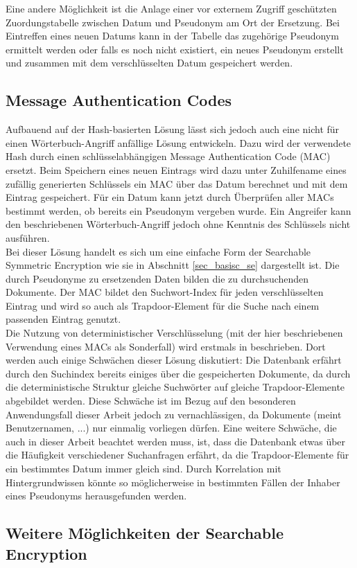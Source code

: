Eine andere Möglichkeit ist die Anlage einer vor externem Zugriff geschützten Zuordungstabelle zwischen Datum und Pseudonym am Ort der Ersetzung. Bei Eintreffen eines neuen Datums kann in der Tabelle das zugehörige Pseudonym ermittelt werden oder falls es noch nicht existiert, ein neues Pseudonym erstellt und zusammen mit dem verschlüsselten Datum gespeichert werden. 


\subsection{Message Authentication Codes}

Aufbauend auf der Hash-basierten Lösung lässt sich jedoch auch eine nicht für einen Wörterbuch-Angriff anfällige Lösung entwickeln. Dazu wird der verwendete Hash durch einen schlüsselabhängigen Message Authentication Code (MAC) ersetzt. Beim Speichern eines neuen Eintrags wird dazu unter Zuhilfename eines zufällig generierten Schlüssels ein MAC über das Datum berechnet und mit dem Eintrag gespeichert. Für ein Datum kann jetzt durch Überprüfen aller MACs bestimmt werden, ob bereits ein Pseudonym vergeben wurde. Ein Angreifer kann den beschriebenen Wörterbuch-Angriff jedoch ohne Kenntnis des Schlüssels nicht ausführen.\\
Bei dieser Lösung handelt es sich um eine einfache Form der Searchable Symmetric Encryption wie sie in Abschnitt \ref{sec_basisc_se} dargestellt ist. Die durch Pseudonyme zu ersetzenden Daten bilden die zu durchsuchenden Dokumente. Der MAC bildet den Suchwort-Index für jeden verschlüsselten Eintrag und wird so auch als Trapdoor-Element für die Suche nach einem passenden Eintrag genutzt. \\
Die Nutzung von deterministischer Verschlüsselung (mit der hier beschriebenen Verwendung eines MACs als Sonderfall) wird erstmals in \cite{bellare2007deterministic} beschrieben. Dort werden auch einige Schwächen dieser Lösung diskutiert: Die Datenbank erfährt durch den Suchindex bereits einiges über die gespeicherten Dokumente, da durch die deterministische Struktur gleiche Suchwörter auf gleiche Trapdoor-Elemente abgebildet werden. Diese Schwäche ist im Bezug auf den besonderen Anwendungsfall dieser Arbeit jedoch zu vernachlässigen, da Dokumente (meint Benutzernamen, ...) nur einmalig vorliegen dürfen. Eine weitere Schwäche, die auch in dieser Arbeit beachtet werden muss, ist, dass die Datenbank etwas über die Häufigkeit verschiedener Suchanfragen erfährt, da die Trapdoor-Elemente für ein bestimmtes Datum immer gleich sind. Durch Korrelation mit Hintergrundwissen könnte so möglicherweise in bestimmten Fällen der Inhaber eines Pseudonyms herausgefunden werden. 

\subsection{Weitere Möglichkeiten der Searchable Encryption}

